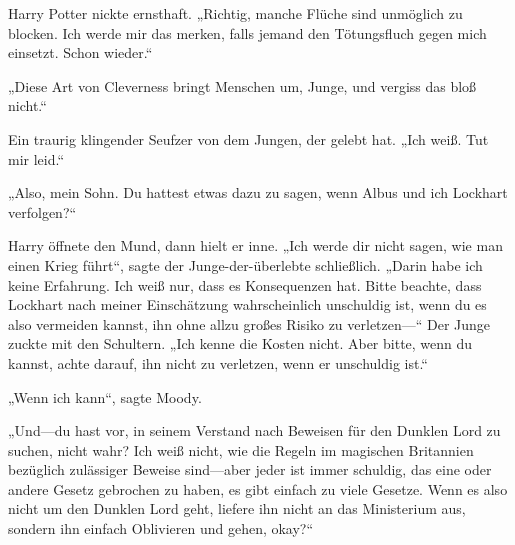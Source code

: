 Harry Potter nickte ernsthaft. „Richtig, manche Flüche sind unmöglich zu blocken. Ich werde mir das merken, falls jemand den Tötungsfluch gegen mich einsetzt. Schon wieder.“

„Diese Art von Cleverness bringt Menschen um, Junge, und vergiss das bloß nicht.“

Ein traurig klingender Seufzer von dem Jungen, der gelebt hat. „Ich weiß. Tut mir leid.“

„Also, mein Sohn. Du hattest etwas dazu zu sagen, wenn Albus und ich Lockhart verfolgen?“

Harry öffnete den Mund, dann hielt er inne. „Ich werde dir nicht sagen, wie man einen Krieg führt“, sagte der Junge-der-überlebte schließlich. „Darin habe ich keine Erfahrung. Ich weiß nur, dass es Konsequenzen hat. Bitte beachte, dass Lockhart nach meiner Einschätzung wahrscheinlich unschuldig ist, wenn du es also vermeiden kannst, ihn ohne allzu großes Risiko zu verletzen—“ Der Junge zuckte mit den Schultern. „Ich kenne die Kosten nicht. Aber bitte, wenn du kannst, achte darauf, ihn nicht zu verletzen, wenn er unschuldig ist.“

„Wenn ich kann“, sagte Moody.

„Und—du hast vor, in seinem Verstand nach Beweisen für den Dunklen Lord zu suchen, nicht wahr? Ich weiß nicht, wie die Regeln im magischen Britannien bezüglich zulässiger Beweise sind—aber jeder ist immer schuldig, das eine oder andere Gesetz gebrochen zu haben, es gibt einfach zu viele Gesetze. Wenn es also nicht um den Dunklen Lord geht, liefere ihn nicht an das Ministerium aus, sondern ihn einfach Oblivieren und gehen, okay?“

